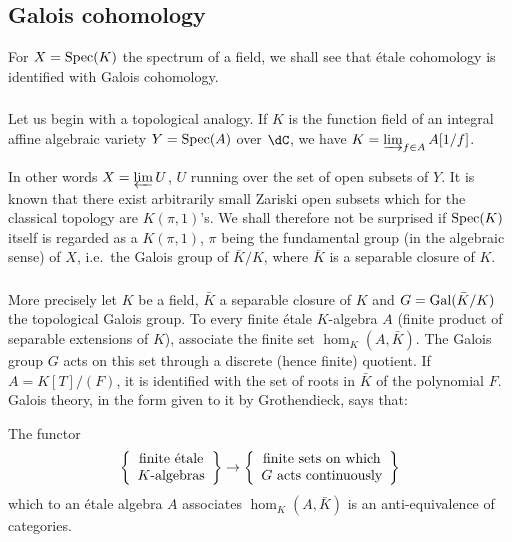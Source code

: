 \subsection{Galois cohomology}\label{I:2-4}

For $X=\operatorname{Spec}(K)$ the spectrum of a field, we shall see that \'etale
cohomology is identified with Galois cohomology. 





\subsubsection{}\label{I:2-4-1}

Let us begin with a topological analogy. If $K$ is the function field
of an integral affine algebraic variety $Y=\operatorname{Spec}(A)$ over $\dC$, we have
$K=\varinjlim_{f\in A} A[1/f]$.

In other words $X=\varprojlim U$, $U$ running over the set of open subsets of $Y$.
It is known that there exist arbitrarily small Zariski open subsets which for the
classical topology are $K(\pi,1)$'s. We shall therefore not be surprised if
$\operatorname{Spec}(K)$ itself is regarded as a $K(\pi,1)$, $\pi$ being the
fundamental group (in the algebraic sense) of $X$, i.e.\ the Galois group of
$\bar K/K$, where $\bar K$ is a separable closure of $K$. 





\subsubsection{}\label{I:2-4-2}

More precisely let $K$ be a field, $\bar K$ a separable closure of $K$ and
$G = \operatorname{Gal}(\bar K/K)$ the topological Galois group. To every finite \'etale
$K$-algebra $A$ (finite product of separable extensions of $K$), associate the
finite set $\hom_K(A,\bar K)$. The Galois group $G$ acts on this set through
a discrete (hence finite) quotient. If $A=K[T]/(F)$, it is identified with
the set of roots in $\bar K$ of the polynomial $F$. Galois theory,
in the form given to it by Grothendieck, says that:





\begin{proposition}\label{I:2-4-3}
The functor
\[
  \left\{\begin{array}{c}
          \textnormal{finite \'etale} \\
          \textnormal{$K$-algebras}
        \end{array}\right\}
  \to
  \left\{\begin{array}{c}
          \textnormal{finite sets on which} \\
          \textnormal{$G$ acts continuously}
        \end{array}\right\}
\]
which to an \'etale algebra $A$ associates $\hom_K(A,\bar K)$ is an
anti-equivalence of categories.
\end{proposition}

